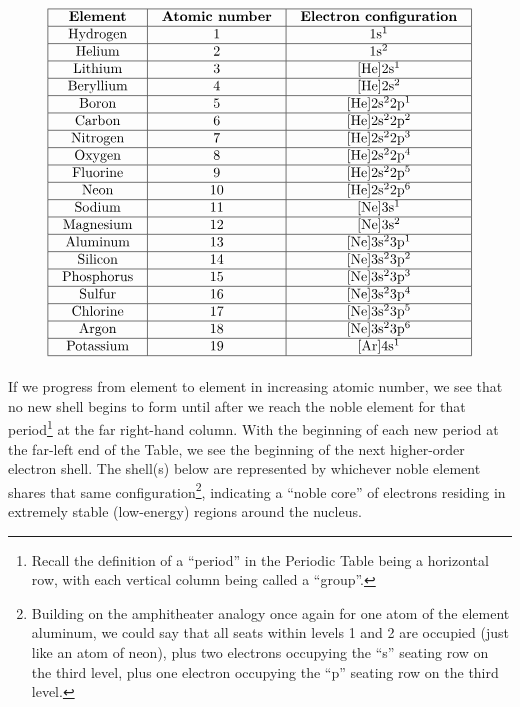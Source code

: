 $$\vbox{\offinterlineskip
\halign{\strut
\vrule \quad\hfil # \ \hfil & 
\vrule \quad\hfil # \ \hfil & 
\vrule \quad\hfil # \ \hfil \vrule \cr
\noalign{\hrule}
%
\textbf{Element} & \textbf{Atomic number} & \textbf{Electron configuration} \cr
%
\noalign{\hrule}
%
Hydrogen & 1 & 1s$^{1}$ \cr
%
\noalign{\hrule}
%
Helium & 2 & 1s$^{2}$ \cr
%
\noalign{\hrule}
%
Lithium & 3 & [He]2s$^{1}$ \cr
%
\noalign{\hrule}
%
Beryllium & 4 & [He]2s$^{2}$ \cr
%
\noalign{\hrule}
%
Boron & 5 & [He]2s$^{2}$2p$^{1}$ \cr
%
\noalign{\hrule}
%
Carbon & 6 & [He]2s$^{2}$2p$^{2}$ \cr
%
\noalign{\hrule}
%
Nitrogen & 7 & [He]2s$^{2}$2p$^{3}$ \cr
%
\noalign{\hrule}
%
Oxygen & 8 & [He]2s$^{2}$2p$^{4}$ \cr
%
\noalign{\hrule}
%
Fluorine & 9 & [He]2s$^{2}$2p$^{5}$ \cr
%
\noalign{\hrule}
%
Neon & 10 & [He]2s$^{2}$2p$^{6}$ \cr
%
\noalign{\hrule}
%
Sodium & 11 & [Ne]3s$^{1}$ \cr
%
\noalign{\hrule}
%
Magnesium & 12 & [Ne]3s$^{2}$ \cr
%
\noalign{\hrule}
%
Aluminum & 13 & [Ne]3s$^{2}$3p$^{1}$ \cr
%
\noalign{\hrule}
%
Silicon & 14 & [Ne]3s$^{2}$3p$^{2}$ \cr
%
\noalign{\hrule}
%
Phosphorus & 15 & [Ne]3s$^{2}$3p$^{3}$ \cr
%
\noalign{\hrule}
%
Sulfur & 16 & [Ne]3s$^{2}$3p$^{4}$ \cr
%
\noalign{\hrule}
%
Chlorine & 17 & [Ne]3s$^{2}$3p$^{5}$ \cr
%
\noalign{\hrule}
%
Argon & 18 & [Ne]3s$^{2}$3p$^{6}$ \cr
%
\noalign{\hrule}
%
Potassium & 19 & [Ar]4s$^{1}$ \cr
%
\noalign{\hrule}
} %
}$$ %

If we progress from element to element in increasing atomic number, we see that no new shell begins to form until after we reach the noble element for that period\footnote{Recall the definition of a ``period'' in the Periodic Table being a horizontal row, with each vertical column being called a ``group''.} at the far right-hand column.  With the beginning of each new period at the far-left end of the Table, we see the beginning of the next higher-order electron shell.  The shell(s) below are represented by whichever noble element shares that same configuration\footnote{Building on the amphitheater analogy once again for one atom of the element aluminum, we could say that all seats within levels 1 and 2 are occupied (just like an atom of neon), plus two electrons occupying the ``s'' seating row on the third level, plus one electron occupying the ``p'' seating row on the third level.}, indicating a ``noble core'' of electrons residing in extremely stable (low-energy) regions around the nucleus.  


